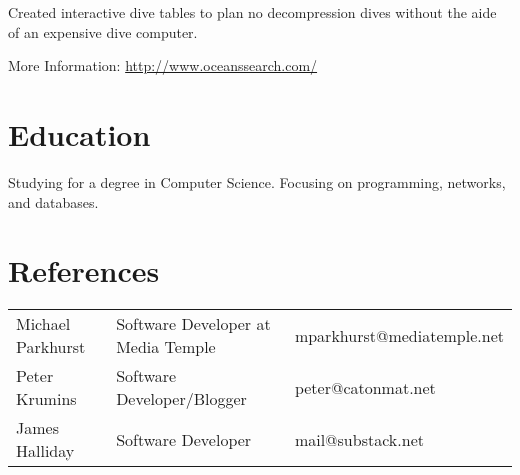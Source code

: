\documentclass[table]{resume}
\begin{document}

\begin{compactitem}
\item Created interactive dive tables to plan no decompression dives without the aide of an expensive dive computer.
\item More Information: \url{http://www.oceanssearch.com/}
\end{compactitem}

\section{Education}

\begin{compactitem}
\item Studying for a degree in Computer Science.  Focusing on programming, networks, and databases.
\end{compactitem}

\section{References}
\begin{tabular}{lll}
\rowcolor{white} Michael Parkhurst & Software Developer at Media Temple & mparkhurst@mediatemple.net \\
\rowcolor{lightgray} Peter Krumins & Software Developer/Blogger & peter@catonmat.net \\
\rowcolor{white} James Halliday & Software Developer & mail@substack.net
\end{tabular}
\end{document}
